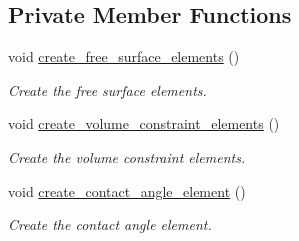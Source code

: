 \subsection*{Private Member Functions}
\begin{DoxyCompactItemize}
\item 
void \hyperlink{classPseudoSolidCapProblem_ac0219ed64385dc20c4fc3c6cc217fd67}{create\+\_\+free\+\_\+surface\+\_\+elements} ()
\begin{DoxyCompactList}\small\item\em Create the free surface elements. \end{DoxyCompactList}\item 
void \hyperlink{classPseudoSolidCapProblem_a0289801610e2bc864c67d4d8557d56b1}{create\+\_\+volume\+\_\+constraint\+\_\+elements} ()
\begin{DoxyCompactList}\small\item\em Create the volume constraint elements. \end{DoxyCompactList}\item 
void \hyperlink{classPseudoSolidCapProblem_a8f28ebf09bc66142725139291b4e21a0}{create\+\_\+contact\+\_\+angle\+\_\+element} ()
\begin{DoxyCompactList}\small\item\em Create the contact angle element. \end{DoxyCompactList}\end{DoxyCompactItemize}
